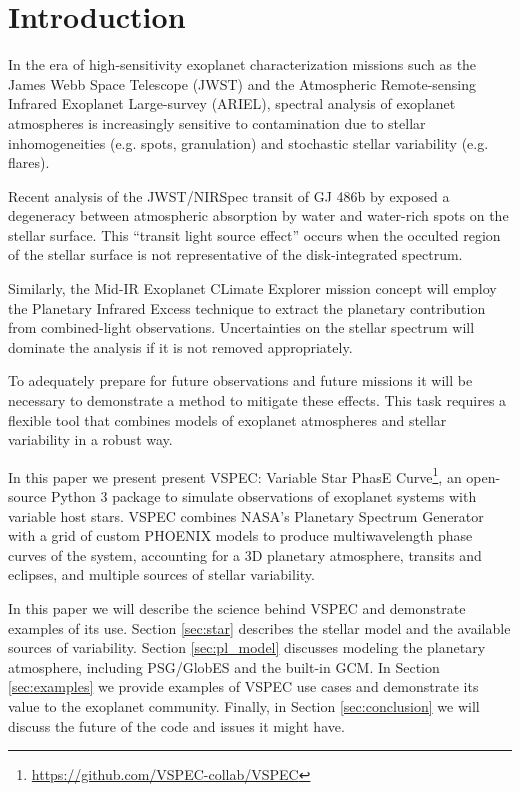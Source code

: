 \documentclass[twocolumn]{aastex631}
\begin{document}

\section{Introduction}
\label{sec:intro}

In the era of high-sensitivity exoplanet characterization missions such as the James Webb Space Telescope (JWST)
and the Atmospheric Remote-sensing Infrared Exoplanet Large-survey (ARIEL), spectral analysis of exoplanet atmospheres
is increasingly sensitive to contamination due to stellar inhomogeneities (e.g. spots, granulation) and stochastic stellar variability (e.g. flares).

Recent analysis of the JWST/NIRSpec transit of GJ 486b by \citet{moran2023} exposed a degeneracy between
atmospheric absorption by water and water-rich spots on the stellar surface. This ``transit light source effect''
\citep[TLS,][see also \citet{apai2018,barclay2021,garcia2022,barclay2023}]{rackham2018}
occurs when the occulted region of the stellar surface is not representative of the disk-integrated spectrum.

Similarly, the Mid-IR Exoplanet CLimate Explorer \citep[MIRECLE,][]{mandell2022} mission concept
will employ the Planetary Infrared Excess \citep[PIE][]{stevenson2020} technique to extract the planetary
contribution from combined-light observations. Uncertainties on the stellar spectrum will dominate the analysis if it is not removed appropriately.

To adequately prepare for future observations and future missions it will be necessary to demonstrate a method to mitigate these effects.
This task requires a flexible tool that combines models of exoplanet atmospheres and stellar variability in a robust way.

In this paper we present present {\sc VSPEC}: Variable Star PhasE Curve\footnote{\url{https://github.com/VSPEC-collab/VSPEC}},
an open-source Python 3 package to simulate observations of exoplanet systems with variable host stars.
{\sc VSPEC} combines NASA's Planetary Spectrum Generator \citep[PSG,][]{villanueva2018} with a grid of
custom PHOENIX models \citep{husser2013} to produce multiwavelength phase curves of the system, accounting
for a 3D planetary atmosphere, transits and eclipses, and multiple sources of stellar variability.

In this paper we will describe the science behind {\sc VSPEC} and demonstrate examples of its use.
Section \ref{sec:star} describes the stellar model and the available sources of variability.
Section \ref{sec:pl_model} discusses modeling the planetary atmosphere, including PSG/GlobES and the
built-in GCM. In Section \ref{sec:examples} we provide examples of {\sc VSPEC} use cases and demonstrate
its value to the exoplanet community. Finally, in Section \ref{sec:conclusion} we will discuss the future of the code and issues it might have.
\end{document}
